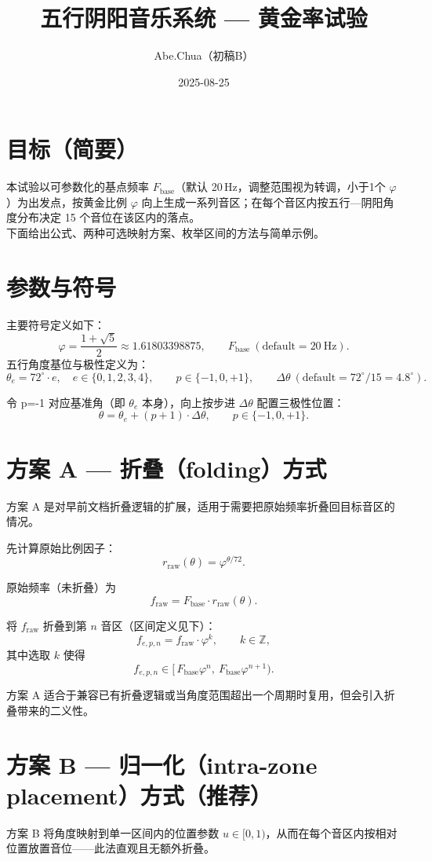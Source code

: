 \documentclass{article}
\title{五行阴阳音乐系统 — 黄金率试验}
\author{Abe.Chua（初稿B）}
\date{2025-08-25}
\begin{document}
\maketitle

\section*{目标（简要）}
本试验以可参数化的基点频率 \(F_{\mathrm{base}}\)（默认 20\,Hz，调整范围视为转调，小于1个 \(\varphi\)）为出发点，按黄金比例 \(\varphi\) 向上生成一系列音区；在每个音区内按五行—阴阳角度分布决定 15 个音位在该区内的落点。
\\下面给出公式、两种可选映射方案、枚举区间的方法与简单示例。

\section*{参数与符号}
主要符号定义如下：
\[
\varphi=\frac{1+\sqrt5}{2}\approx1.61803398875,\qquad F_{\mathrm{base}}\ (\text{default}=20\ \mathrm{Hz}).
\]
五行角度基位与极性定义为：
\[
\theta_e = 72^\circ\cdot e,\quad e\in\{0,1,2,3,4\},\qquad p\in\{-1,0,+1\},\qquad \Delta\theta\ (\text{default}=72^\circ/15=4.8^\circ).
\]

令 p=-1 对应基准角（即 \(\theta_e\) 本身），向上按步进 \(\Delta\theta\) 配置三极性位置：
\[
\theta=\theta_e + (p+1)\cdot\Delta\theta,\qquad p\in\{-1,0,+1\}.
\]

\section*{方案 A — 折叠（folding）方式}
方案 A 是对早前文档折叠逻辑的扩展，适用于需要把原始频率折叠回目标音区的情况。

先计算原始比例因子：
\[
r_{\mathrm{raw}}(\theta)=\varphi^{\theta/72}.
\]

原始频率（未折叠）为
\[
f_{\mathrm{raw}} = F_{\mathrm{base}}\cdot r_{\mathrm{raw}}(\theta).
\]

将 \(f_{\mathrm{raw}}\) 折叠到第 \(n\) 音区（区间定义见下）：
\[
f_{e,p,n} = f_{\mathrm{raw}}\cdot\varphi^{k},\qquad k\in\mathbb{Z},
\]
其中选取 \(k\) 使得
\[
f_{e,p,n}\in[\,F_{\mathrm{base}}\varphi^{n},\ F_{\mathrm{base}}\varphi^{n+1}).
\]

方案 A 适合于兼容已有折叠逻辑或当角度范围超出一个周期时复用，但会引入折叠带来的二义性。

\section*{方案 B — 归一化（intra-zone placement）方式（推荐）}
方案 B 将角度映射到单一区间内的位置参数 \(u\in[0,1)\)，从而在每个音区内按相对位置放置音位——此法直观且无额外折叠。
\end{document}
